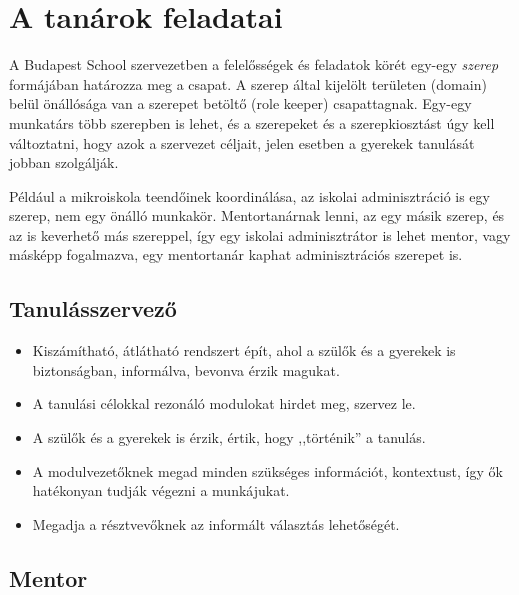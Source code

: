 \section{A tanárok feladatai}\label{sec:tanarfeladatok}

A Budapest School szervezetben a felelősségek és feladatok körét egy-egy \emph{szerep} formájában határozza meg a csapat. A szerep által kijelölt területen (domain) belül önállósága van a szerepet betöltő (role keeper) csapattagnak. Egy-egy munkatárs több szerepben is lehet, és a szerepeket és a szerepkiosztást úgy kell változtatni, hogy azok a szervezet céljait, jelen esetben a gyerekek tanulását jobban szolgálják.

Például a mikroiskola teendőinek koordinálása, az iskolai adminisztráció is egy szerep, nem egy önálló munkakör.  Mentortanárnak lenni, az egy másik szerep, és az is keverhető más szereppel, így egy iskolai adminisztrátor is lehet men\-tor, vagy másképp fogalmazva, egy mentortanár kaphat adminisztrációs szerepet is.



\subsection{Tanulásszervező}\label{sec:tanulasszervezo}
\begin{itemize}
    \item Kiszámítható, átlátható rendszert épít, ahol a szülők és a gyerekek is biztonságban, informálva, bevonva érzik magukat.
    \item A tanulási célokkal rezonáló modulokat hirdet meg, szervez le.
    \item A szülők és a gyerekek is érzik, értik, hogy ,,történik'' a tanulás.
    \item A modulvezetőknek megad minden szükséges információt, kontextust, így ők hatékonyan tudják végezni a munkájukat.
    \item Megadja a résztvevőknek az informált választás lehetőségét.
\end{itemize}

\subsection{Mentor}\label{mentor}

